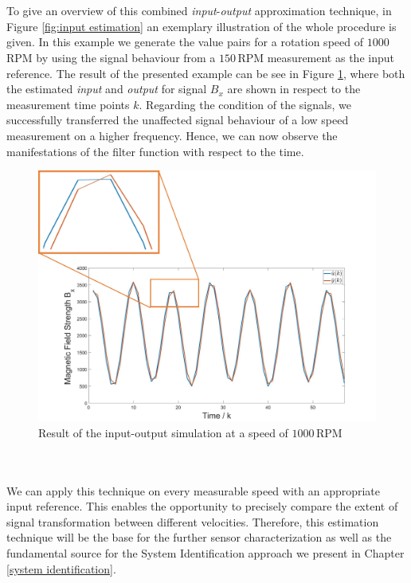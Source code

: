 \documentclass[english]{isasthesis}
\begin{document}
    		\\\\To give an overview of this combined \textit{input}-\textit{output} approximation technique, in Figure \ref{fig:input estimation} an exemplary illustration of the whole procedure is given. In this example we generate the value pairs for a rotation speed of $1000\,$RPM by using the signal behaviour from a $150\,$RPM measurement as the input reference. The result of the presented example can be see in Figure \ref{fig:input output time}, where both the estimated \textit{input} and \textit{output} for signal $B_x$ are shown in respect to the measurement time points $k$. Regarding the condition of the signals, we successfully transferred the unaffected signal behaviour of a low speed measurement on a higher frequency. Hence, we can now observe the manifestations of the filter function with respect to the time.
    		\begin{figure}[t]
    		\begin{center}
    			\includegraphics[width=1\textwidth]{figures/input_output_time_final_1.jpg}   
  			\end{center}
    		\caption{Result of the input-output simulation at a speed of $1000\,$RPM}
    		\label{fig:input output time}
    		\end{figure}
    		\\\\We can apply this technique on every measurable speed with an appropriate input reference. This enables the opportunity to precisely compare the extent of signal transformation between different velocities. Therefore, this estimation technique will be the base for the further sensor characterization as well as the fundamental source for the System Identification approach we present in Chapter \ref{system identification}. 
\end{document}
